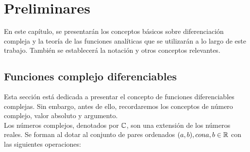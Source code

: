 \chapter{Preliminares}
En este capítulo, se presentarán los conceptos básicos sobre diferenciación compleja y la teoría de las funciones analíticas que se utilizarán a lo largo de este trabajo. También se establecerá la notación y otros conceptos relevantes.
\section{Funciones complejo diferenciables} \label{sec:Fcd}
Esta sección está dedicada a presentar el concepto de funciones diferenciables complejas. Sin embargo, antes de ello, recordaremos los conceptos de número complejo, valor absoluto y argumento.\\
Los números complejos, denotados por $\mathbb{C}$, son una extensión de los números reales. Se forman al dotar al conjunto de pares ordenados $(a, b), con a, b \in \mathbb{R}$ con las siguientes operaciones:

